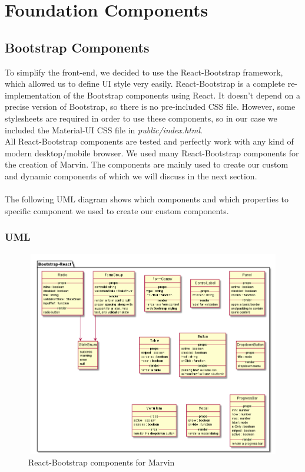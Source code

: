 \documentclass[../react]{subfiles}
\begin{document}
	
	\section{Foundation Components}

	\subsection{Bootstrap Components} To simplify the front-end, we decided to use the React-Bootstrap framework, which allowed us to define UI style very easily. React-Bootstrap is a complete re-implementation of the Bootstrap components using React. It doesn't depend on a precise version of Bootstrap, so there is no pre-included CSS file. However, some stylesheets are required in order to use these components, so in our case we included the Material-UI CSS file in \textit{public/index.html}. \\ All React-Bootstrap components are tested and perfectly work with any kind of modern desktop/mobile browser. We used many React-Bootstrap components for the creation of Marvin. The components are mainly used to create our custom and dynamic components 
	of which we will discuss in the next section. \\ \\ The following UML diagram shows which components and which properties to specific component we used to create our custom components. 
		\subsubsection{UML}
		\begin{figure}[h]
			\centering
			\includegraphics[width=14cm,height=9cm]{"diagrammi/react/bootstrap"}
			\caption{React-Bootstrap components for Marvin}
			\label{fig:React-Bootstrap components for Marvin}
		\end{figure}
	\newpage
\end{document}
